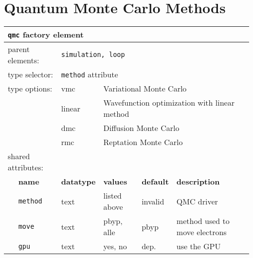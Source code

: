 \chapter{Quantum Monte Carlo Methods}
\label{chap:qmcmethods}

\begin{table}[h]
\begin{center}
\begin{tabularx}{\textwidth}{l l l l l l }
\hline
\multicolumn{6}{l}{\texttt{qmc} factory element} \\
\hline
\multicolumn{2}{l}{parent elements:} & \multicolumn{4}{l}{\texttt{simulation, loop}}\\
\multicolumn{2}{l}{type   selector:} & \multicolumn{4}{l}{\texttt{method} attribute}\\
\multicolumn{2}{l}{type   options: } & vmc           & \multicolumn{3}{l}{Variational Monte Carlo}\\
\multicolumn{2}{l}{                } & linear        & \multicolumn{3}{l}{Wavefunction optimization with linear method}\\
\multicolumn{2}{l}{                } & dmc           & \multicolumn{3}{l}{Diffusion Monte Carlo}\\
\multicolumn{2}{l}{                } & rmc           & \multicolumn{3}{l}{Reptation Monte Carlo}\\
\multicolumn{2}{l}{shared attributes:} & \multicolumn{4}{l}{}\\
   &   \bfseries name         & \bfseries datatype & \bfseries values & \bfseries default & \bfseries description \\
   &   \texttt{method}        &  text              &   listed above   & invalid           & QMC driver            \\
   &   \texttt{move}          &  text              &   pbyp, alle     & pbyp              & method used to move electrons \\
   &   \texttt{gpu}           &  text              &   yes, no        & dep.              & use the GPU\\

\end{tabularx}
\end{center}
\end{table}
